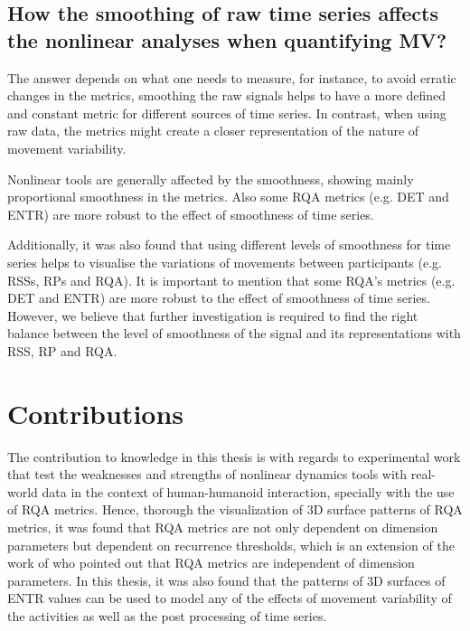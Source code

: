 

\subsection{How the smoothing of raw time series affects the 
	nonlinear analyses when quantifying MV?}
The answer depends on what one needs to measure, for instance, to 
avoid erratic changes in the metrics, smoothing the raw signals helps
to have a more defined and constant metric for different sources of time 
series. In contrast, when using raw data, the 
metrics might create a closer representation of the nature of movement 
variability.

Nonlinear tools are generally affected by the smoothness, 
showing mainly proportional smoothness in the metrics. 
Also some RQA metrics (e.g. DET and  ENTR) are more robust to the 
effect of smoothness of time series.

Additionally, it was also found that using different levels of smoothness
for time series helps to visualise the variations of movements 
between participants (e.g. RSSs, RPs and RQA).
It is important to mention that some RQA's metrics (e.g. DET and  ENTR) 
are more robust to the effect of smoothness of time series.
However, we believe that further investigation is required to find the 
right balance between the level of smoothness of the signal
and its representations with RSS, RP and RQA.



\section{Contributions}
The contribution to knowledge in this thesis is with regards
to experimental work that test the weaknesses and strengths of 
nonlinear dynamics tools with real-world data in the context of 
human-humanoid interaction, specially with the use of RQA metrics.
Hence, thorough the visualization of 3D surface patterns of RQA metrics, 
it was found that RQA metrics are not only dependent on dimension 
parameters but dependent on recurrence thresholds, which is an extension 
of the work of \cite{iwanski1998} who pointed out that RQA metrics 
are independent of dimension parameters.
In this thesis, it was also found that the patterns of 3D surfaces 
of ENTR values can be used to model any of the effects of movement 
variability of the activities as well as the post processing of 
time series.



